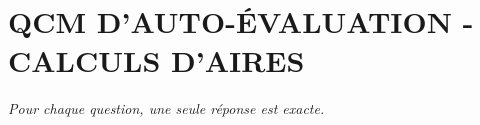 
\section*{\textcolor{chapcolor}{\MakeUppercase{QCM d'auto-évaluation - Calculs d'aires}}}

\begin{center}
\textit{Pour chaque question, une seule réponse est exacte.}
\end{center}

